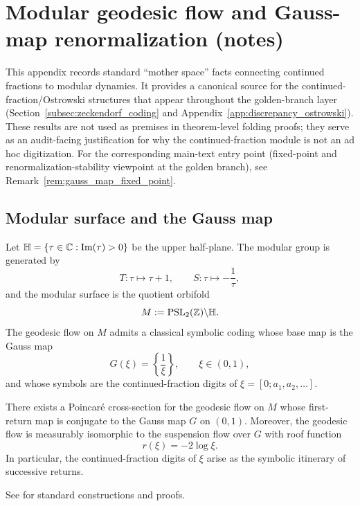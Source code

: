 \section{Modular geodesic flow and Gauss-map renormalization (notes)}
\label{app:modular_flow_gauss_map}

\AuditTag This appendix records standard ``mother space'' facts connecting continued fractions to modular dynamics.
It provides a canonical source for the continued-fraction/Ostrowski structures that appear throughout the golden-branch layer (Section~\ref{subsec:zeckendorf_coding} and Appendix~\ref{app:discrepancy_ostrowski}).
These results are not used as premises in theorem-level folding proofs; they serve as an audit-facing justification for why the continued-fraction module is not an ad hoc digitization.
For the corresponding main-text entry point (fixed-point and renormalization-stability viewpoint at the golden branch), see Remark~\ref{rem:gauss_map_fixed_point}.

\subsection{Modular surface and the Gauss map}
\label{subsec:modular_surface_gauss}

Let $\mathbb{H}=\{\tau\in\mathbb{C}:\operatorname{Im}(\tau)>0\}$ be the upper half-plane.
The modular group is generated by
\[
T:\tau\mapsto \tau+1,\qquad S:\tau\mapsto -\frac{1}{\tau},
\]
and the modular surface is the quotient orbifold
\[
M:=\mathrm{PSL}_2(\mathbb{Z})\backslash\mathbb{H}.
\]
The geodesic flow on $M$ admits a classical symbolic coding whose base map is the Gauss map
\[
G(\xi)=\left\{\frac{1}{\xi}\right\},\qquad \xi\in(0,1),
\]
and whose symbols are the continued-fraction digits of $\xi=[0;a_1,a_2,\ldots]$.

\begin{theorem}
\label{thm:series_suspension_gauss_z128}
\MathTag There exists a Poincar\'e cross-section for the geodesic flow on $M$ whose first-return map is conjugate to the Gauss map $G$ on $(0,1)$.
Moreover, the geodesic flow is measurably isomorphic to the suspension flow over $G$ with roof function
\[
r(\xi)=-2\log \xi.
\]
In particular, the continued-fraction digits of $\xi$ arise as the symbolic itinerary of successive returns.
\end{theorem}
\begin{remark}
See \cite{Series1985,KatokHasselblatt1995} for standard constructions and proofs.
\end{remark}

